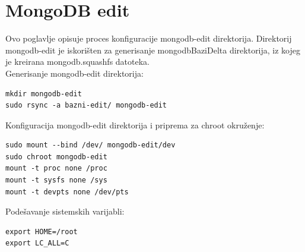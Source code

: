 \documentclass[12pt,vi]{mitthesis}
\begin{document}
\section*{MongoDB edit}
Ovo poglavlje opisuje proces konfiguracije mongodb-edit direktorija. Direktorij mongodb-edit je iskorišten za generisanje mongodbBaziDelta direktorija, iz kojeg je kreirana mongodb.squashfs datoteka.\\
\noindent
Generisanje mongodb-edit direktorija:
\begin{lstlisting}[style=BashInputStyle]
mkdir mongodb-edit
sudo rsync -a bazni-edit/ mongodb-edit
\end{lstlisting}

\noindent
Konfiguracija mongodb-edit direktorija i priprema za chroot okruženje:
\begin{lstlisting}[style=BashInputStyle]
sudo mount --bind /dev/ mongodb-edit/dev
sudo chroot mongodb-edit
mount -t proc none /proc
mount -t sysfs none /sys
mount -t devpts none /dev/pts
\end{lstlisting}
\noindent
Podešavanje sistemskih varijabli:
\begin{lstlisting}[style=BashInputStyle]
export HOME=/root
export LC_ALL=C
\end{lstlisting}
\end{document}
